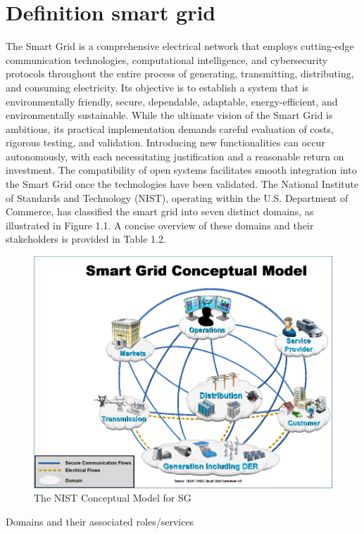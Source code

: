\section{Definition smart grid}
The Smart Grid is a comprehensive electrical network that employs cutting-edge communication technologies, computational intelligence, and cybersecurity protocols throughout the entire process of generating, transmitting, distributing, and consuming electricity. Its objective is to establish a system that is environmentally friendly, secure, dependable, adaptable, energy-efficient, and environmentally sustainable. While the ultimate vision of the Smart Grid is ambitious, its practical implementation demands careful evaluation of costs, rigorous testing, and validation. Introducing new functionalities can occur autonomously, with each necessitating justification and a reasonable return on investment. The compatibility of open systems facilitates smooth integration into the Smart Grid once the technologies have been validated.\cite{gharavi2011smart}
 The National Institute of Standards and Technology (NIST), operating within the U.S. Department of Commerce, has classified the smart grid into seven distinct domains, as illustrated in Figure 1.1. A concise overview of these domains and their stakeholders is provided in Table 1.2.\cite{gopstein2021nist}
\begin{figure}[h]
	\centering
	\includegraphics[width=\textwidth]{figures/nist.PNG}
	\caption{The NIST Conceptual Model for SG \cite{gopstein2021nist}}
\end{figure}
\begin{table}[h]
    \centering
    
    \caption{Domains and their associated roles/services \cite{gopstein2021nist}}
\end{table}
